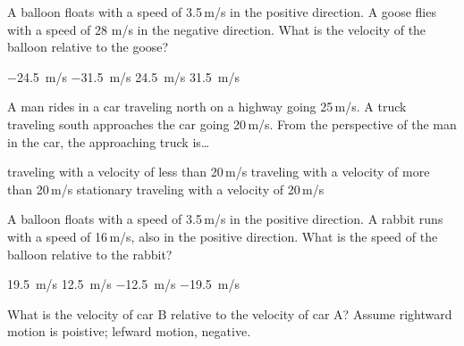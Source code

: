 \documentclass[answers]{exam}
\begin{document}
\begin{questions}
\question
A balloon floats with a speed of 3.5\,m/s in the positive direction.  A goose flies with a speed of 28 m/s in the negative direction. What is the velocity of the balloon relative to the goose?

\begin{randomizechoices}
    \choice \SI{-24.5}{m/s}
    \choice \SI{-31.5}{m/s}
    \choice \SI{24.5}{m/s}
    \correctchoice \SI{31.5}{m/s}
\end{randomizechoices}

\question
A man rides in a car traveling north on a highway going 25\,m/s. A truck traveling south approaches the car going 20\,m/s. From the perspective of the man in the car, the approaching truck is\dots

\begin{randomizechoices}
    \choice traveling with a velocity of less than 20\,m/s
    \choice traveling with a velocity of more than 20\,m/s
    \choice stationary
    \choice traveling with a velocity of 20\,m/s
\end{randomizechoices}

\question
A balloon floats with a speed of 3.5\,m/s in the positive direction. A rabbit runs with a speed of 16\,m/s, also in the positive direction. What is the speed of the balloon relative to the rabbit?

\begin{randomizechoices}
    \choice \SI{19.5}{m/s}
    \choice \SI{12.5}{m/s}
    \correctchoice \SI{-12.5}{m/s}
    \choice \SI{-19.5}{m/s}
\end{randomizechoices}

\question
What is the velocity of car B relative to the velocity of car A? Assume rightward motion is poistive; lefward motion, negative.

\begin{center}
\end{center}


\end{questions}
\end{document}
